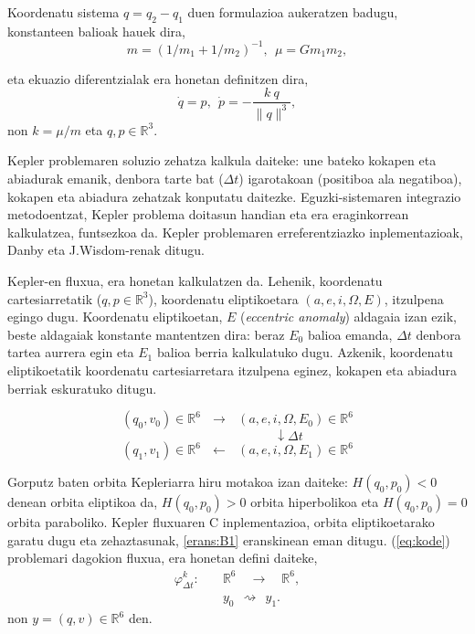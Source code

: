 Koordenatu sistema $q=q_2-q_1$ duen formulazioa aukeratzen badugu, konstanteen balioak hauek dira,  
\begin{equation*}
m=(1/m_1+1/m_2)^{-1},\ \ \mu=Gm_1m_2,
\end{equation*} 

eta ekuazio diferentzialak era honetan definitzen dira,
\begin{equation}
\label{eq:kode}
\dot{q}=p, \ \ \dot{p}= - \frac{k \ q}{\|q\|^3} ,
\end{equation}
non $k= \mu / m$ eta  $q,p \in \mathbb{R}^3$.

Kepler problemaren soluzio zehatza kalkula daiteke: une bateko kokapen eta abiadurak emanik, denbora tarte bat ($\Delta t$) igarotakoan (positiboa ala negatiboa), kokapen eta abiadura zehatzak konputatu daitezke. Eguzki-sistemaren integrazio metodoentzat, Kepler problema doitasun handian eta era eraginkorrean kalkulatzea, funtsezkoa da. Kepler problemaren erreferentziazko inplementazioak, Danby \cite{Danby1992} eta J.Wisdom-renak  \cite{Wisdom2015} ditugu. 

Kepler-en fluxua, era honetan kalkulatzen da. Lehenik, koordenatu cartesiarretatik ($q,p\in \mathbb{R}^3$), koordenatu eliptikoetara $(a,e,i,\Omega,E)$, itzulpena egingo dugu. Koordenatu eliptikoetan, $E$ (\emph{eccentric anomaly}) aldagaia izan ezik, beste aldagaiak konstante mantentzen dira: beraz $E_0$ balioa emanda, $\Delta t$ denbora tartea aurrera egin eta $E_1$ balioa berria kalkulatuko dugu. Azkenik, koordenatu eliptikoetatik koordenatu cartesiarretara itzulpena eginez, kokapen eta abiadura berriak eskuratuko ditugu. 

\begin{equation*}
(q_0,v_0) \in \mathbb{R}^6 \ \ \ \longrightarrow \ \ \  (a,e,i,\Omega,E_0) \in \mathbb{R}^6 
\end{equation*}
\begin{equation*}
\quad \quad \quad \quad \quad \quad \quad \quad \downarrow \Delta t
\end{equation*}
\begin{equation*}
(q_1,v_1) \in \mathbb{R}^6 \ \ \ \longleftarrow \ \ \  (a,e,i,\Omega,E_1) \in \mathbb{R}^6 
\end{equation*}

Gorputz baten orbita Kepleriarra hiru motakoa izan daiteke: $H(q_0,p_0)<0$ denean orbita eliptikoa da, $H(q_0,p_0)>0$ orbita hiperbolikoa eta $H(q_0,p_0)=0$ orbita  paraboliko. Kepler fluxuaren C inplementazioa, orbita eliptikoetarako garatu dugu eta zehaztasunak, \ref{erans:B1} eranskinean eman ditugu. (\ref{eq:kode}) problemari dagokion fluxua, era honetan defini daiteke,
\begin{align*}
\varphi_{\Delta t}^k:&  \quad \mathbb{R}^{6} \quad  \longrightarrow \quad \mathbb{R}^6,  \\
&  \quad y_0 \ \  \rightsquigarrow \ \ y_1. 
\end{align*} 
non $y=(q,v) \in \mathbb{R}^6$  den.


